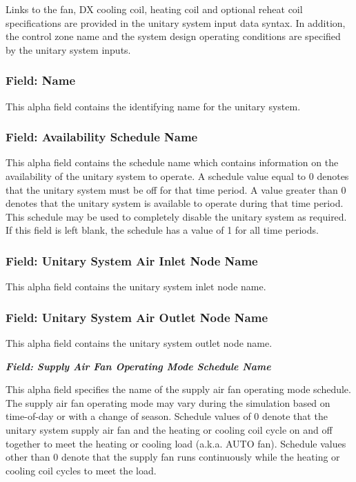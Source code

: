 Links to the fan, DX cooling coil, heating coil and optional reheat coil specifications are provided in the unitary system input data syntax. In addition, the control zone name and the system design operating conditions are specified by the unitary system inputs.

\subsubsection{Field: Name}\label{field-name-3-034}

This alpha field contains the identifying name for the unitary system.

\subsubsection{Field: Availability Schedule Name}\label{field-availability-schedule-name-2-008}

This alpha field contains the schedule name which contains information on the availability of the unitary system to operate. A schedule value equal to 0 denotes that the unitary system must be off for that time period. A value greater than 0 denotes that the unitary system is available to operate during that time period. This schedule may be used to completely disable the unitary system as required. If this field is left blank, the schedule has a value of 1 for all time periods.

\subsubsection{Field: Unitary System Air Inlet Node Name}\label{field-unitary-system-air-inlet-node-name-1}

This alpha field contains the unitary system inlet node name.

\subsubsection{Field: Unitary System Air Outlet Node Name}\label{field-unitary-system-air-outlet-node-name-1}

This alpha field contains the unitary system outlet node name.

\textbf{\emph{Field: Supply Air Fan Operating Mode Schedule Name}}

This alpha field specifies the name of the supply air fan operating mode schedule. The supply air fan operating mode may vary during the simulation based on time-of-day or with a change of season. Schedule values of 0 denote that the unitary system supply air fan and the heating or cooling coil cycle on and off together to meet the heating or cooling load (a.k.a. AUTO fan). Schedule values other than 0 denote that the supply fan runs continuously while the heating or cooling coil cycles to meet the load.

